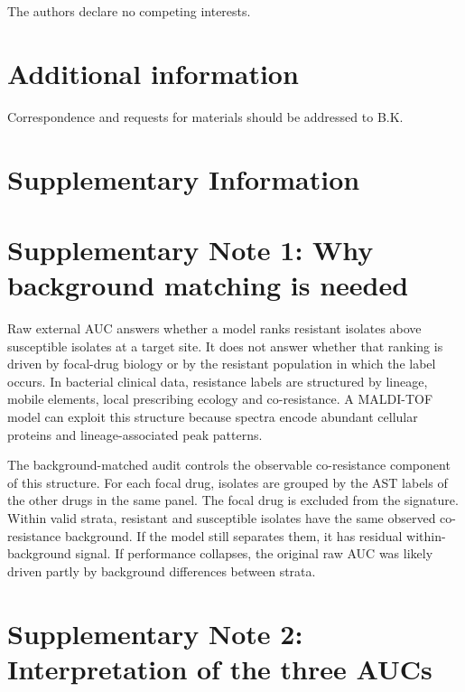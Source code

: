 \documentclass[11pt]{article}
\begin{document}
The authors declare no competing interests.

\section*{Additional information}

Correspondence and requests for materials should be addressed to B.K.




\clearpage
\appendix
\setcounter{figure}{0}
\setcounter{table}{0}
\renewcommand{\thefigure}{S\arabic{figure}}
\renewcommand{\thetable}{S\arabic{table}}

\section*{Supplementary Information}

\section*{Supplementary Note 1: Why background matching is needed}

Raw external AUC answers whether a model ranks resistant isolates above susceptible isolates at a target site. It does not answer whether that ranking is driven by focal-drug biology or by the resistant population in which the label occurs. In bacterial clinical data, resistance labels are structured by lineage, mobile elements, local prescribing ecology and co-resistance. A MALDI-TOF model can exploit this structure because spectra encode abundant cellular proteins and lineage-associated peak patterns.

The background-matched audit controls the observable co-resistance component of this structure. For each focal drug, isolates are grouped by the AST labels of the other drugs in the same panel. The focal drug is excluded from the signature. Within valid strata, resistant and susceptible isolates have the same observed co-resistance background. If the model still separates them, it has residual within-background signal. If performance collapses, the original raw AUC was likely driven partly by background differences between strata.

\section*{Supplementary Note 2: Interpretation of the three AUCs}
\end{document}
